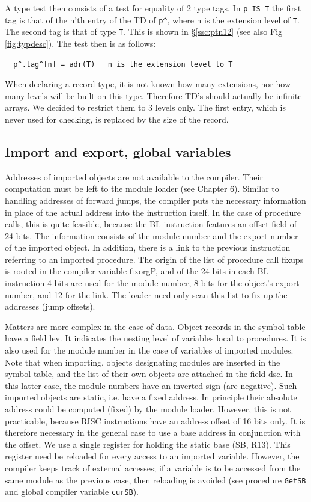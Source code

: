 A type test then consists of a test for equality of 2 type tags. In \verb|p IS T| the first tag is that
of the n’th entry of the TD of \verb|p^|, where n is the extension level of \verb|T|. The second tag is
that of type \verb|T|. This is shown in \S \ref{ssc:ptn12} (see also Fig \ref{fig:typdesc}).
The test then is as follows:
\begin{verbatim}
  p^.tag^[n] = adr(T)   n is the extension level to T
\end{verbatim}

When declaring a record type, it is not known how many extensions, nor how many levels will be
built on this type. Therefore TD’s should actually be infinite arrays. We decided to restrict them to 3
levels only. The first entry, which is never used for checking, is replaced by the size of the record.

\subsection{Import and export, global variables}
Addresses of imported objects are not available to the compiler. Their computation must be left to
the module loader (see Chapter 6). Similar to handling addresses of forward jumps, the compiler
puts the necessary information in place of the actual address into the instruction itself. In the case
of procedure calls, this is quite feasible, because the BL instruction features an offset field of 24
bits. The information consists of the module number and the export number of the imported object.
In addition, there is a link to the previous instruction referring to an imported procedure. The origin
of the list of procedure call fixups is rooted in the compiler variable fixorgP, and of the 24 bits in
each BL instruction 4 bits are used for the module number, 8 bits for the object's export number,
and 12 for the link. The loader need only scan this list to fix up the addresses (jump offsets).

Matters are more complex in the case of data. Object records in the symbol table have a field lev. It
indicates the nesting level of variables local to procedures. It is also used for the module number in
the case of variables of imported modules. Note that when importing, objects designating modules
are inserted in the symbol table, and the list of their own objects are attached in the field dsc. In
this latter case, the module numbers have an inverted sign (are negative). Such imported objects are
static, i.e. have a fixed address. In principle their absolute address could be computed (fixed) by the
module loader. However, this is not practicable, because RISC instructions have an address offset
of 16 bits only. It is therefore necessary in the general case to use a base address in conjunction
with the offset. We use a single register for holding the static base (SB, R13). This register need be
reloaded for every access to an imported variable. However, the compiler keeps track of external
accesses; if a variable is to be accessed from the same module as the previous case, then
reloading is avoided (see procedure \verb|GetSB| and global compiler variable \verb|curSB|).

